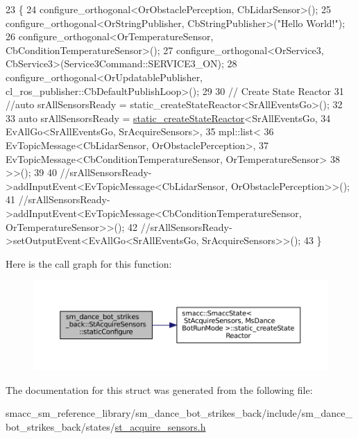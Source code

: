 \begin{DoxyCode}
23    \{
24       configure\_orthogonal<OrObstaclePerception, CbLidarSensor>();
25       configure\_orthogonal<OrStringPublisher, CbStringPublisher>(\textcolor{stringliteral}{"Hello World!"});
26       configure\_orthogonal<OrTemperatureSensor, CbConditionTemperatureSensor>();
27       configure\_orthogonal<OrService3, CbService3>(Service3Command::SERVICE3\_ON);
28       configure\_orthogonal<OrUpdatablePublisher, cl\_ros\_publisher::CbDefaultPublishLoop>();
29 
30       \textcolor{comment}{// Create State Reactor}
31       \textcolor{comment}{//auto srAllSensorsReady = static\_createStateReactor<SrAllEventsGo>();}
32 
33       \textcolor{keyword}{auto} srAllSensorsReady = \hyperlink{classsmacc_1_1SmaccState_a892be704b48f93bf5c35635d1a58ed54}{static\_createStateReactor}<SrAllEventsGo,
34                                                          EvAllGo<SrAllEventsGo, SrAcquireSensors>,
35                                                          mpl::list<
36                                                                      EvTopicMessage<CbLidarSensor,
       OrObstaclePerception>,
37                                                                      
      EvTopicMessage<CbConditionTemperatureSensor, OrTemperatureSensor>
38                                                                   >>();
39 
40       \textcolor{comment}{//srAllSensorsReady->addInputEvent<EvTopicMessage<CbLidarSensor, OrObstaclePerception>>();}
41       \textcolor{comment}{//srAllSensorsReady->addInputEvent<EvTopicMessage<CbConditionTemperatureSensor,
       OrTemperatureSensor>>();}
42       \textcolor{comment}{//srAllSensorsReady->setOutputEvent<EvAllGo<SrAllEventsGo, SrAcquireSensors>>();}
43    \}
\end{DoxyCode}
Here is the call graph for this function\+:
\nopagebreak
\begin{figure}[H]
\begin{center}
\leavevmode
\includegraphics[width=350pt]{structsm__dance__bot__strikes__back_1_1StAcquireSensors_a83de29e9c8ce05f82c487b91255f9fe1_cgraph}
\end{center}
\end{figure}


The documentation for this struct was generated from the following file\+:\begin{DoxyCompactItemize}
\item 
smacc\+\_\+sm\+\_\+reference\+\_\+library/sm\+\_\+dance\+\_\+bot\+\_\+strikes\+\_\+back/include/sm\+\_\+dance\+\_\+bot\+\_\+strikes\+\_\+back/states/\hyperlink{strikes__back_2include_2sm__dance__bot__strikes__back_2states_2st__acquire__sensors_8h}{st\+\_\+acquire\+\_\+sensors.\+h}\end{DoxyCompactItemize}
